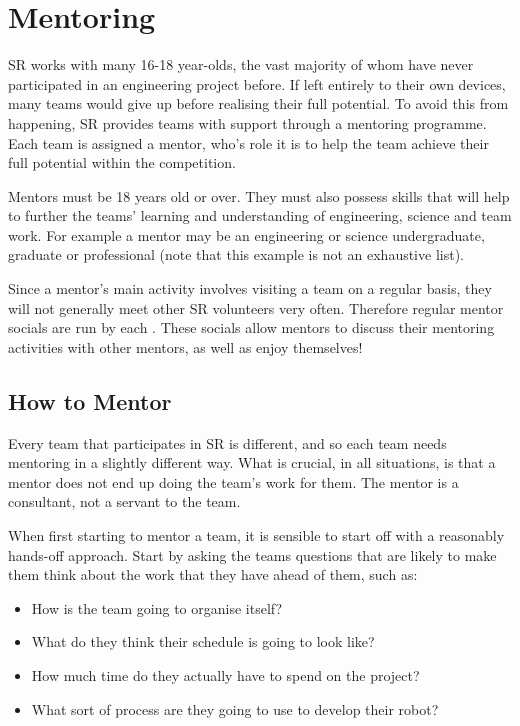 \section{Mentoring}

SR works with many 16-18 year-olds, the vast majority of whom have never participated in an engineering project before.  If left entirely to their own devices, many teams would give up before realising their full potential.  To avoid this from happening, SR provides teams with support through a mentoring programme.  Each team is assigned a mentor, who's role it is to help the team achieve their full potential within the competition.

Mentors must be 18 years old or over.  They must also possess skills that will help to further the teams' learning and understanding of engineering, science and team work. For example a mentor may be an engineering or science undergraduate, graduate or professional (note that this example is not an exhaustive list).

Since a mentor's main activity involves visiting a team on a regular basis, they will not generally meet other SR volunteers very often.  Therefore regular mentor socials are run by each .  These socials allow mentors to discuss their mentoring activities with other mentors, as well as enjoy themselves!

\subsection{How to Mentor}
Every team that participates in SR is different, and so each team needs mentoring in a slightly different way.  What is crucial, in all situations, is that a mentor does not end up doing the team's work for them.  The mentor is a consultant, not a servant to the team.

When first starting to mentor a team, it is sensible to start off with a reasonably hands-off approach.  Start by asking the teams questions that are likely to make them think about the work that they have ahead of them, such as:
\begin{itemize}
\item How is the team going to organise itself?
\item What do they think their schedule is going to look like?
\item How much time do they actually have to spend on the project?
\item What sort of process are they going to use to develop their robot?
\end{itemize}

